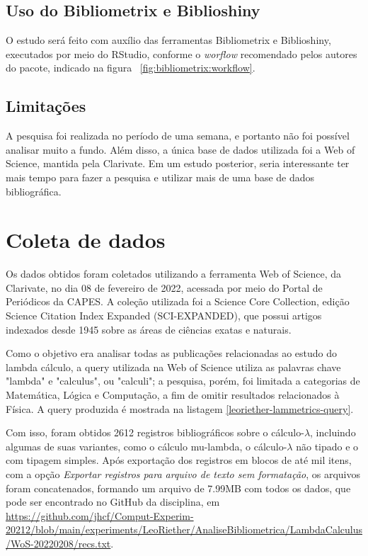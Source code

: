 \subsection{Uso do Bibliometrix e Biblioshiny}
O estudo será feito com auxílio das ferramentas Bibliometrix e Biblioshiny, executados por meio do RStudio, conforme o \textit{worflow} recomendado pelos autores do pacote, indicado na figura ~\ref{fig:bibliometrix:workflow}.

\subsection{Limitações}
A pesquisa foi realizada no período de uma semana, e portanto não foi possível analisar muito a fundo. Além disso, a única base de dados utilizada foi a Web of Science, mantida pela Clarivate. Em um estudo posterior, seria interessante ter mais tempo para fazer a pesquisa e utilizar mais de uma base de dados bibliográfica.


\section{Coleta de dados\label{leoriether:lammetrics:coleta}}
Os dados obtidos foram coletados utilizando a ferramenta Web of Science, da Clarivate, no dia 08 de fevereiro de 2022, acessada por meio do Portal de Periódicos da CAPES. A coleção utilizada foi a Science Core Collection, edição Science Citation Index Expanded (SCI-EXPANDED), que possui artigos indexados desde 1945 sobre as áreas de ciências exatas e naturais.

Como o objetivo era analisar todas as publicações relacionadas ao estudo do lambda cálculo, a query utilizada na Web of Science utiliza as palavras chave "lambda" e "calculus", ou "calculi"; a pesquisa, porém, foi limitada a categorias de Matemática, Lógica e Computação, a fim de omitir resultados relacionados à Física. A query produzida é mostrada na listagem \ref{leoriether-lammetrics-query}.



Com isso, foram obtidos 2612 registros bibliográficos sobre o cálculo-$\lambda$, incluindo algumas de suas variantes, como o cálculo mu-lambda, o cálculo-$\lambda$ não tipado e o com tipagem simples. Após exportação dos registros em blocos de até mil itens, com a opção \textit{Exportar registros para arquivo de texto sem formatação}, os arquivos foram concatenados, formando um arquivo de 7.99MB com todos os dados, que pode ser encontrado no GitHub da disciplina, em \url{https://github.com/jhcf/Comput-Experim-20212/blob/main/experiments/LeoRiether/AnaliseBibliometrica/LambdaCalculus/WoS-20220208/recs.txt}.

